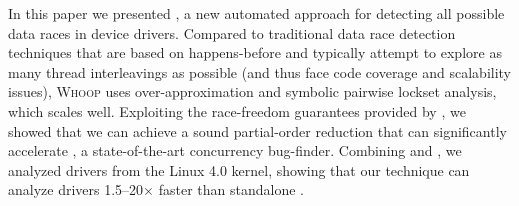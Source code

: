 In this paper we presented \whoop, a new automated approach for detecting all possible data races in device drivers. Compared to traditional data race detection techniques that are based on happens-before and typically attempt to explore as many thread interleavings as possible (and thus face code coverage and scalability issues), \textsc{Whoop} uses over-approximation and symbolic pairwise lockset analysis, which scales well. Exploiting the race-freedom guarantees provided by \whoop, we showed that we can achieve a sound partial-order reduction that can significantly accelerate \corral, a state-of-the-art concurrency bug-finder. Combining \whoop and \corral, we analyzed \sizeOfBenchmarks drivers from the Linux 4.0 kernel, showing that our technique can analyze drivers 1.5--20$\times$ faster than standalone \corral.
